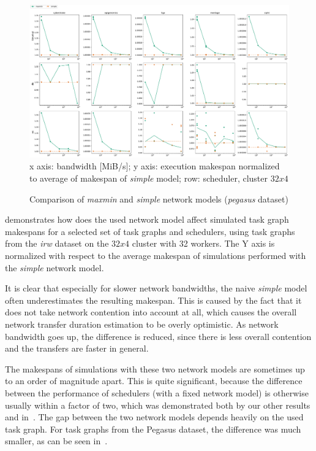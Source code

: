 \begin{figure}
	\centering
	\includegraphics[width=\textwidth]{imgs/estee/charts/pegasus-32x4-netmodel-score}
	\\ {\small x axis: bandwidth [MiB/s]; y axis: execution makespan normalized
	to average of makespan of \emph{simple} model; row: scheduler, cluster
	$32x4$} \caption{Comparison of \emph{maxmin} and \emph{simple} network models
	(\emph{pegasus} dataset)} \label{fig:estee-chart-pegasus-netmodel}
\end{figure}

 demonstrates how does the used network model affect simulated task
graph makespans for a selected set of task graphs and schedulers, using task graphs from the
\emph{irw} dataset on the $32x4$ cluster with 32 workers. The Y axis
is normalized with respect to the average makespan of simulations performed with the
\emph{simple} network model.

It is clear that especially for slower network bandwidths, the naive \emph{simple} model
often underestimates the resulting makespan. This is caused by the fact that it does not take
network contention into account at all, which causes the overall network transfer duration
estimation to be overly optimistic. As network bandwidth goes up, the difference is reduced, since
there is less overall contention and the transfers are faster in general.

The makespans of simulations with these two network models are sometimes up to an order of
magnitude apart. This is quite significant, because the difference between the performance of
schedulers (with a fixed network model) is otherwise usually within a factor of two, which was
demonstrated both by our other results and in~\cite{wang2018list}. The gap between the two
network models depends heavily on the used task graph. For task graphs from the Pegasus dataset,
the difference was much smaller, as can be seen in~.

